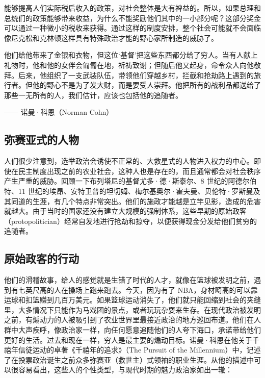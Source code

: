 能够提高人们实际税后收入的政策，对社会整体是大有裨益的。所以，如果总理和总统们的政策能够带来收益，为什么不能奖励他们其中的一小部分呢？这部分奖金可以通过一种微小的税收来获得。通过这样的制度安排，整个社会可能就不会面临像尼克松和克林顿这样具有特殊政治才能的野心家所制造的威胁了。

\begin{tcolorbox}
\kaishu 他们给他带来了金银和衣物，但这位‘基督’把这些东西都分给了穷人。当有人献上礼物时，他和他的女伴会匍匐在地，祈祷致谢；但随后他又起身，命令众人向他敬拜。后来，他组织了一支武装队伍，带领他们穿越乡村，拦截和抢劫路上遇到的旅行者。但他的野心不是为了发大财，而是要受人崇拜。他把所有的战利品都送给了那些一无所有的人，我们估计，应该也包括他的追随者。
\begin{flushright}
—— 诺曼·科恩（Norman Cohn）
\end{flushright}
\end{tcolorbox}


\subsection{弥赛亚式的人物}
人们很少注意到，选举政治会诱使不正常的、大救星式的人物进入权力的中心。即使在民主制度出现之前的农业社会，这种人也是存在的，而且通常都会对社会秩序产生严重的威胁。回顾一下布列塔尼的基督尤多·德·斯泰尔、8 世纪的阿德尔伯特、11 世纪的埃昂、安特卫普的坦切姆、梅尔基奥尔·霍夫曼、贝伦特·罗斯曼及其同道的生涯，有几个特点非常突出。他们的施政才能越是立竿见影，造成的危害就越大。由于当时的国家还没有建立大规模的强制体系，这些早期的原始政客（protopolitician）经常自发地进行抢劫和掠夺，以便获得现金分发给他们贫穷的追随者。

\subsection{原始政客的行动}
他们的滑稽故事，给人的感觉就是生错了时代的人才，就像在篮球被发明之前，遇到有七英尺高的人在操场上跑来跑去。今天，因为有了 NBA，身材畸高的可以靠运球和扣篮赚到几百万美元。如果篮球运动消失了，他们就只能回缩到社会的夹缝里，大多情况下只能作为马戏团的景点，或者玩玩杂耍来生存。在现代政治被发明之前，有煽动力的人被吸引到了农业世界里最接近政治的地方巡回布道。他们在人群中大声疾呼，像政治家一样，向任何愿意追随他们的人夸下海口，承诺带给他们更好的生活。过去和现在一样，穷人是最主要的煽动目标。诺曼·科恩在他关于千禧年信徒运动的卓著《千禧年的追求》（The Pursuit of the Millennium）中，记述了在投票政治诞生之前众多弥赛亚（救世主）式领袖的职业生涯。从他的描述中可以很容易看出，这些人的个性类型，与现代时期的魅力政治家如出一辙：

